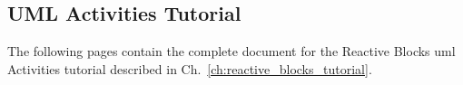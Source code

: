 \begin{appendices}

\chapter{UML Activities Tutorial}
\label{appx:tutorial}
The following pages contain the complete document for the Reactive Blocks \gls{uml} Activities tutorial described in Ch.~\ref{ch:reactive_blocks_tutorial}.















\end{appendices}